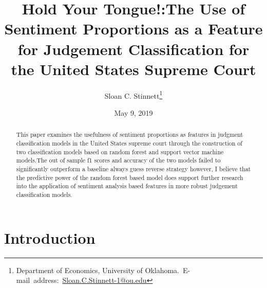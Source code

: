 \documentclass[12pt,english]{article}
\begin{document}
\begin{singlespace}
\title{Hold Your Tongue!:The Use of Sentiment Proportions as a Feature for Judgement Classification for the United States Supreme Court}
\end{singlespace}

\author{Sloan C. Stinnett\thanks{Department of Economics, University of Oklahoma.\
E-mail~address:~\href{mailto:student.name@ou.edu}{Sloan.C.Stinnett-1@ou.edu}}}

\date{May 9, 2019}

\maketitle

\begin{abstract}
\begin{singlespace}
This paper examines the usefulness of sentiment proportions as features in judgment classification models in the United States supreme court through the construction of two classification models based on random forest and support vector machine models.The out of sample f1 scores and accuracy of the two models failed to significantly outperform a baseline always guess reverse strategy however, I believe that the predictive power of the random forest based model does support further research into the application of sentiment analysis based features in more robust judgement classification models.

\end{singlespace}
\end{abstract}
\vfill{}


\pagebreak{}
\maketitle

\section{Introduction}
\end{document}
